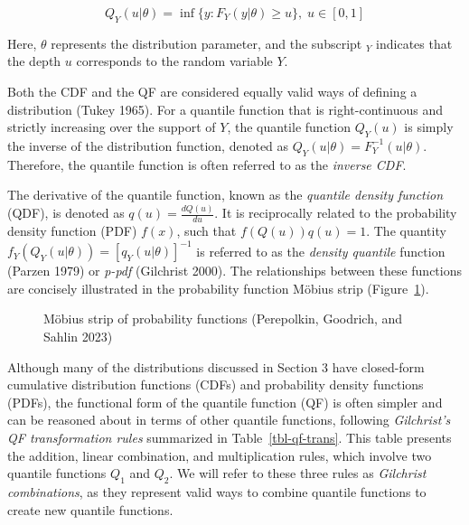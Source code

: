 \documentclass[
]{interact}
\begin{document}
\[
Q_Y(u\vert\theta)=\inf\{y:F_Y(y\vert\theta)\geq u\}, \; u\in[0,1]
\]

Here, \(\theta\) represents the distribution parameter, and the
subscript \(_Y\) indicates that the depth \(u\) corresponds to the
random variable \(Y\).

Both the CDF and the QF are considered equally valid ways of defining a
distribution (Tukey 1965). For a quantile function that is
right-continuous and strictly increasing over the support of \(Y\), the
quantile function \(Q_Y(u)\) is simply the inverse of the distribution
function, denoted as \(Q_Y(u\vert\theta)=F_Y^{-1}(u\vert\theta)\).
Therefore, the quantile function is often referred to as the
\emph{inverse CDF}.

The derivative of the quantile function, known as the \emph{quantile
density function} (QDF), is denoted as \(q(u) = \frac{dQ(u)}{du}\). It
is reciprocally related to the probability density function (PDF)
\(f(x)\), such that \(f(Q(u))q(u) = 1\). The quantity
\(f_Y(Q_Y(u\vert\theta))=[q_Y(u\vert\theta)]^{-1}\) is referred to as
the \emph{density quantile} function (Parzen 1979) or \emph{p-pdf}
(Gilchrist 2000). The relationships between these functions are
concisely illustrated in the probability function Möbius strip
(Figure~\ref{fig-moebius-chart}).

\begin{figure}


\caption{\label{fig-moebius-chart}Möbius strip of probability functions
(Perepolkin, Goodrich, and Sahlin 2023)}

\end{figure}%

Although many of the distributions discussed in Section 3 have
closed-form cumulative distribution functions (CDFs) and probability
density functions (PDFs), the functional form of the quantile function
(QF) is often simpler and can be reasoned about in terms of other
quantile functions, following \emph{Gilchrist's QF transformation rules}
summarized in Table~\ref{tbl-qf-trans}. This table presents the
addition, linear combination, and multiplication rules, which involve
two quantile functions \(Q_1\) and \(Q_2\). We will refer to these three
rules as \emph{Gilchrist combinations}, as they represent valid ways to
combine quantile functions to create new quantile functions.
\end{document}
